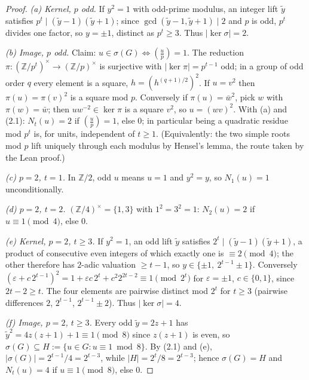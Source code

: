 \begin{proof}
  \emph{(a) Kernel, $p$ odd.} If $y^2 = 1$ with odd-prime modulus, an integer
  lift $\tilde{y}$ satisfies $p^{t} \mid (\tilde{y}-1)(\tilde{y}+1)$; since
  $\gcd(\tilde{y}-1, \tilde{y}+1) \mid 2$ and $p$ is odd, $p^{t}$ divides one
  factor, so $y = \pm 1$, distinct as $p^{t} \geq 3$. Thus $|\ker\sigma| = 2$.

  \emph{(b) Image, $p$ odd.} Claim: $u \in \sigma(G) \iff
  \left(\frac{u}{p}\right) = 1$. The reduction
  $\pi : (\mathbb{Z}/p^{t})^\times \to (\mathbb{Z}/p)^\times$ is surjective with
  $|\ker\pi| = p^{t-1}$ odd; in a group of odd order $q$ every element is a
  square, $h = (h^{(q+1)/2})^2$. If $u = v^2$ then $\pi(u) = \pi(v)^2$ is a
  square mod $p$. Conversely if $\pi(u) = \bar{w}^2$, pick $w$ with
  $\pi(w) = \bar{w}$; then $uw^{-2} \in \ker\pi$ is a square $v^2$, so
  $u = (wv)^2$. With (a) and (2.1): $N_t(u) = 2$ if
  $\left(\frac{u}{p}\right) = 1$, else $0$; in particular being a quadratic
  residue mod $p^{t}$ is, for units, independent of $t \geq 1$.
  (Equivalently: the two simple roots mod $p$ lift uniquely through each
  modulus by Hensel's lemma, the route taken by the Lean proof.)

  \emph{(c) $p = 2$, $t = 1$.} In $\mathbb{Z}/2$, odd $u$ means $u = 1$ and
  $y^2 = y$, so $N_1(u) = 1$ unconditionally.

  \emph{(d) $p = 2$, $t = 2$.} $(\mathbb{Z}/4)^\times = \{1,3\}$ with
  $1^2 = 3^2 = 1$: $N_2(u) = 2$ if $u \equiv 1 \pmod 4$, else $0$.

  \emph{(e) Kernel, $p = 2$, $t \geq 3$.} If $y^2 = 1$, an odd lift $\tilde{y}$
  satisfies $2^{t} \mid (\tilde{y}-1)(\tilde{y}+1)$, a product of consecutive
  even integers of which exactly one is $\equiv 2 \pmod 4$; the other therefore
  has $2$-adic valuation $\geq t-1$, so $y \in \{\pm 1,\ 2^{t-1} \pm 1\}$.
  Conversely $(\varepsilon + c\,2^{t-1})^2 = 1 + \varepsilon c\,2^{t} +
  c^2 2^{2t-2} \equiv 1 \pmod{2^{t}}$ for $\varepsilon = \pm 1$, $c \in \{0,1\}$,
  since $2t - 2 \geq t$. The four elements are pairwise distinct mod $2^{t}$
  for $t \geq 3$ (pairwise differences $2$, $2^{t-1}$, $2^{t-1} \pm 2$). Thus
  $|\ker\sigma| = 4$.

  \emph{(f) Image, $p = 2$, $t \geq 3$.} Every odd $\tilde{y} = 2z+1$ has
  $\tilde{y}^2 = 4z(z+1) + 1 \equiv 1 \pmod 8$ since $z(z+1)$ is even, so
  $\sigma(G) \subseteq H := \{u \in G : u \equiv 1 \bmod 8\}$. By (2.1) and (e),
  $|\sigma(G)| = 2^{t-1}/4 = 2^{t-3}$, while $|H| = 2^{t}/8 = 2^{t-3}$; hence
  $\sigma(G) = H$ and $N_t(u) = 4$ if $u \equiv 1 \pmod 8$, else $0$.


\end{proof}
